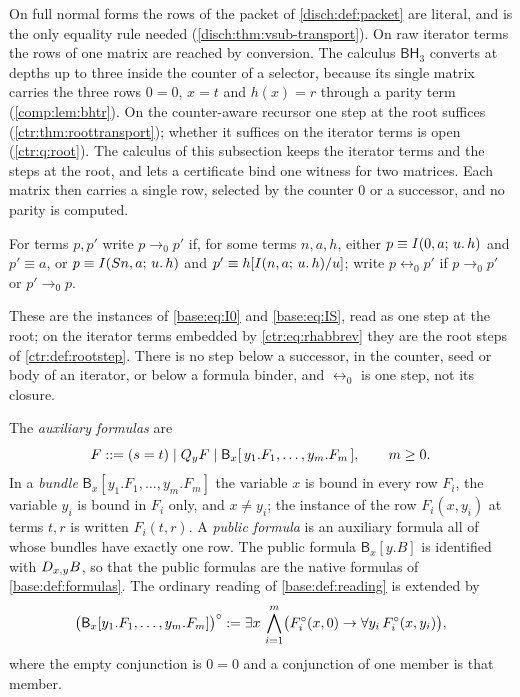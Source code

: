 On full normal forms the rows of the packet of \cref{disch:def:packet} are
literal, and  is the only equality rule needed
(\cref{disch:thm:vsub-transport}). On raw iterator terms the rows of one
matrix are reached by conversion. The calculus $\mathsf{BH}_3$ converts at
depths up to three inside the counter of a selector, because its single
matrix carries the three rows $0=0$, $x=t$ and $h(x)=r$ through a parity
term (\cref{comp:lem:bhtr}). On the counter-aware recursor one step at the
root suffices (\cref{ctr:thm:roottransport}); whether it suffices on the
iterator terms is open (\cref{ctr:q:root}). The calculus of this subsection
keeps the iterator terms and the steps at the root, and lets a certificate
bind one witness for two matrices. Each matrix then carries a single row,
selected by the counter $0$ or a successor, and no parity is computed.

\begin{definition}
\label{disch:def:rootstep}
For terms $p,p'$ write $p\to_0p'$ if, for some terms $n,a,h$, either
$p\equiv I(0,a;\,u.\,h)$ and $p'\equiv a$, or
$p\equiv I(S n,a;\,u.\,h)$ and $p'\equiv h[I(n,a;\,u.\,h)/u]$;
write $p\leftrightarrow_0p'$ if $p\to_0p'$ or $p'\to_0p$.
\end{definition}

These are the instances of \eqref{base:eq:I0} and \eqref{base:eq:IS}, read
as one step at the root; on the iterator terms embedded by
\eqref{ctr:eq:rhabbrev} they are the root steps of \cref{ctr:def:rootstep}.
There is no step below a successor, in the counter, seed or body of an
iterator, or below a formula binder, and $\leftrightarrow_0$ is one step,
not its closure.

\begin{definition}[Bundles]
\label{disch:def:bundle}
The \emph{auxiliary formulas} are
\[
 F ::= (s=t)\mid Q_{y}F\mid\mathsf B_x[\,y_1.F_1,\dots,y_m.F_m\,],
 \qquad m\geq0 .
\]
In a \emph{bundle} $\mathsf B_x[y_1.F_1,\dots,y_m.F_m]$ the variable $x$ is
bound in every row $F_i$, the variable $y_i$ is bound in $F_i$ only, and
$x\neq y_i$; the instance of the row $F_i(x,y_i)$ at terms $t,r$ is written
$F_i(t,r)$. A \emph{public formula} is an auxiliary formula all of whose
bundles have exactly one row. The public formula $\mathsf B_x[y.B]$ is
identified with $D_{x,y}B$, so that the public formulas are the native
formulas of \cref{base:def:formulas}. The ordinary reading of
\cref{base:def:reading} is extended by
\[
 \bigl(\mathsf B_x[y_1.F_1,\dots,y_m.F_m]\bigr)^\circ\mathrel{:=}
 \exists x\,\bigwedge_{i=1}^{m}
 \bigl(F_i^\circ(x,0)\to\forall y_i\,F_i^\circ(x,y_i)\bigr),
\]
where the empty conjunction is $0=0$ and a conjunction of one member is
that member.
\end{definition}

